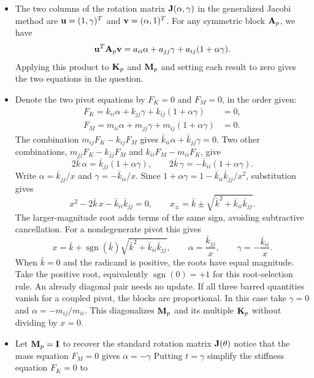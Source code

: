 \documentclass[12pt]{article}
\begin{document}
\begin{itemize}
\[            =\vct I,
         \]
   \item[b)] The two columns of the rotation matrix $\mathbf{J}(\alpha,\gamma)$ in the generalized Jacobi method are $\mathbf{u}=(1,\gamma)^{T}$ and $\mathbf{v}=(\alpha,1)^{T}$. For any symmetric block $\mathbf{A}_p$, we have
         \[
            \mathbf{u}^{T}\mathbf{A}_p\mathbf{v}
            = a_{ii}\alpha+a_{jj}\gamma+a_{ij}(1+\alpha\gamma).
         \]
         Applying this product to $\mathbf{K}_p$ and $\mathbf{M}_p$ and setting each result to zero gives the two equations in the question.
   \item[c)] Denote the two pivot equations by $F_K=0$ and $F_M=0$, in the order given:
         \begin{align*}
            F_K=k_{ii}\alpha+k_{jj}\gamma+k_{ij}(1+\alpha\gamma) & =0, \\
            F_M=m_{ii}\alpha+m_{jj}\gamma+m_{ij}(1+\alpha\gamma) & =0.
         \end{align*}
         The combination $m_{ij}F_K-k_{ij}F_M$ gives
         $\bar k_{ii}\alpha+\bar k_{jj}\gamma=0$. Two other combinations,
         $m_{jj}F_K-k_{jj}F_M$ and $k_{ii}F_M-m_{ii}F_K$, give
         \[
            2\bar k\,\alpha=\bar k_{jj}(1+\alpha\gamma),\qquad
            2\bar k\,\gamma=-\bar k_{ii}(1+\alpha\gamma).
         \]
         Write $\alpha=\bar k_{jj}/x$ and $\gamma=-\bar k_{ii}/x$. Since
         $1+\alpha\gamma=1-\bar k_{ii}\bar k_{jj}/x^2$, substitution gives
         \[
            x^2-2\bar k\,x-\bar k_{ii}\bar k_{jj}=0,\qquad
            x_\pm=\bar k\pm\sqrt{\bar k^2+\bar k_{ii}\bar k_{jj}} .
         \]
         The larger-magnitude root adds terms of the same sign, avoiding
         subtractive cancellation. For a nondegenerate pivot this gives
         \[
            x=\bar k+\operatorname{sgn}(\bar k)
            \sqrt{\bar k^2+\bar k_{ii}\bar k_{jj}},\qquad
            \alpha=\frac{\bar k_{jj}}{x},\qquad
            \gamma=-\frac{\bar k_{ii}}{x}.
         \]
         When $\bar k=0$ and the radicand is positive, the roots have equal
         magnitude. Take the positive root, equivalently $\operatorname{sgn}(0)=+1$
         for this root-selection rule. An already diagonal pair needs no update.
         If all three barred quantities vanish for a coupled pivot, the blocks are
         proportional. In this case take $\gamma=0$ and
         $\alpha=-m_{ij}/m_{ii}$. This diagonalizes $\mathbf{M}_p$ and its multiple
         $\mathbf{K}_p$ without dividing by $x=0$.
   \item[d)] Let $\mathbf{M}_p=\mathbf{I}$ to recover the standard rotation matrix $\mathbf{J}(\theta)$ notice that the mass equation $F_M=0$ gives $\alpha=-\gamma$ Putting $t=\gamma$ simplify the stiffness equation $F_K=0$ to

\end{itemize}
\end{document}
